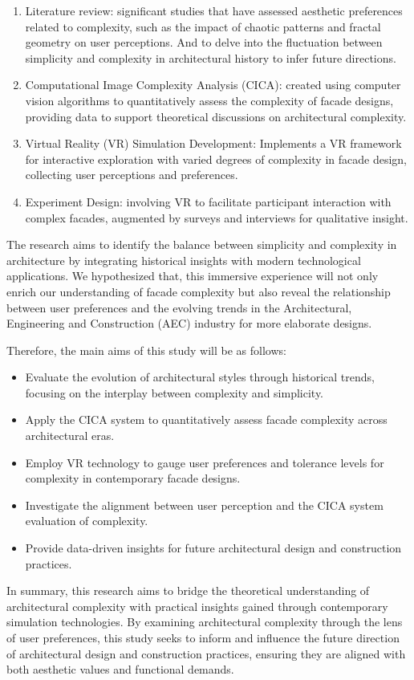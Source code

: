 \begin{enumerate}
    \item Literature review: significant studies that have assessed aesthetic preferences related to complexity, such as the impact of chaotic patterns and fractal geometry on user perceptions.
    And to delve into the fluctuation between simplicity and complexity in architectural history to infer future directions.
    \item Computational Image Complexity Analysis (CICA): created using computer vision algorithms to quantitatively assess the complexity of facade designs, providing data to support theoretical discussions on architectural complexity.
    \item Virtual Reality (VR) Simulation Development: Implements a VR framework for interactive exploration with varied degrees of complexity in facade design, collecting user perceptions and preferences.
    \item Experiment Design: involving VR to facilitate participant interaction with complex facades, augmented by surveys and interviews for qualitative insight.
\end{enumerate}

The research aims to identify the balance between simplicity and complexity in architecture by integrating historical insights with modern technological applications.
We hypothesized that, this immersive experience will not only enrich our understanding of facade complexity but also reveal the relationship between user preferences and the evolving trends in the Architectural, Engineering and Construction (AEC) industry for more elaborate designs.

Therefore, the main aims of this study will be as follows:

\begin{itemize}
    \item Evaluate the evolution of architectural styles through historical trends, focusing on the interplay between complexity and simplicity.
    \item Apply the CICA system to quantitatively assess facade complexity across architectural eras.
    \item Employ VR technology to gauge user preferences and tolerance levels for complexity in contemporary facade designs.
    \item Investigate the alignment between user perception and the CICA system evaluation of complexity.
    \item Provide data-driven insights for future architectural design and construction practices.
\end{itemize}

In summary, this research aims to bridge the theoretical understanding of architectural complexity with practical insights gained through contemporary simulation technologies.
By examining architectural complexity through the lens of user preferences, this study seeks to inform and influence the future direction of architectural design and construction practices, ensuring they are aligned with both aesthetic values and functional demands.


%
